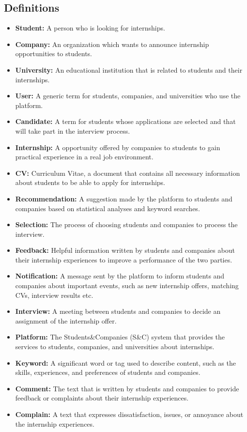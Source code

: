 \subsection{Definitions}\label{subsec:definitions}
\begin{itemize}
    \item \textbf{Student:} A person who is looking for internships.
    \item \textbf{Company:} An organization which wants to announce internship opportunities to students.
    \item \textbf{University:} An educational institution that is related to students and their internships.
    \item \textbf{User:} A generic term for students, companies, and universities who use the platform.
    \item \textbf{Candidate:} A term for students whose applications are selected and that will take part in the interview process.
    \item \textbf{Internship:} A opportunity offered by companies to students to gain practical experience in a real job environment.
    \item \textbf{CV:} Curriculum Vitae, a document that contains all necessary information about students to be able to apply for internships.
    \item \textbf{Recommendation:} A suggestion made by the platform to students and companies based on statistical analyses and keyword searches.
    \item \textbf{Selection:} The process of choosing students and companies to process the interview.
    \item \textbf{Feedback:} Helpful information written by students and companies about their internship experiences to improve a performance 
    of the two parties.
    \item \textbf{Notification:} A message sent by the platform to inform students and companies about important events, such as new internship 
    offers, matching CVs, interview results etc.
    \item \textbf{Interview:} A meeting between students and companies to decide an assignment of the internship offer.
    \item \textbf{Platform:} The Students\&Companies (S\&C) system that provides the services to students, companies, and universities about
    internships.
    \item \textbf{Keyword:} A significant word or tag used to describe content, such as the skills, experiences, and preferences of students and 
    companies.
    \item \textbf{Comment:} The text that is written by students and companies to provide feedback or complaints about their internship experiences.
    \item \textbf{Complain:} A text that expresses dissatisfaction, issues, or annoyance about the internship experiences.
\end{itemize}

